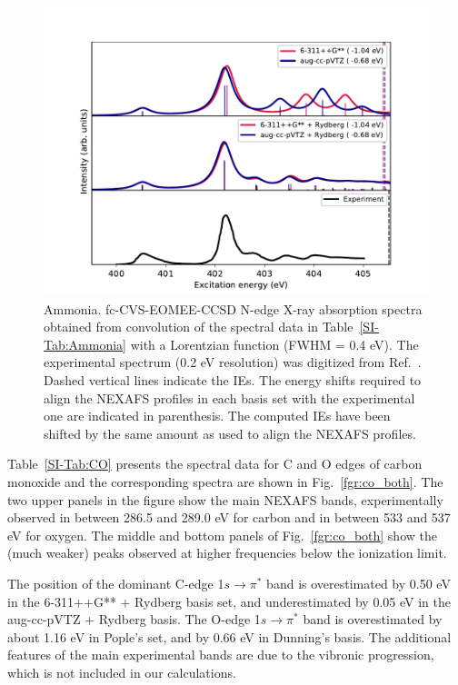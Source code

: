 \documentclass[journal=jctcce,manuscript=article]{achemso}
\begin{document}
\begin{figure}[H]
\includegraphics[width=1\textwidth]{Spectra/NH3.pdf}
\caption{Ammonia. fc-CVS-EOMEE-CCSD N-edge X-ray absorption spectra obtained from convolution of the spectral data in Table~\ref{SI-Tab:Ammonia} 
with a Lorentzian function (FWHM = 0.4 eV). The experimental spectrum (0.2 eV resolution) was digitized from Ref.~. Dashed vertical lines indicate the IEs.
The energy shifts 
required to align the NEXAFS profiles in each basis set with the
experimental one are indicated in parenthesis. The computed IEs have been shifted by the same amount as used to align the NEXAFS profiles.
\label{fgr:ammonia}}
\end{figure}

Table~\ref{SI-Tab:CO} presents the spectral data for C and O edges of carbon monoxide and the corresponding spectra are shown in Fig.~\ref{fgr:co_both}. The two upper panels in the figure show the main NEXAFS bands, experimentally observed 
in between 286.5 and 289.0 eV for carbon and in between 533 and 537 eV for oxygen. The middle and bottom panels of Fig.~\ref{fgr:co_both}
show the (much weaker) peaks observed at higher frequencies below 
the ionization limit.

The position of the dominant C-edge 1$s\to \pi^\ast$ band  is overestimated by 0.50 eV in the 6-311++G** + Rydberg basis set,
and underestimated by 0.05 eV in the aug-cc-pVTZ + Rydberg basis. 
The O-edge 1$s\to \pi^\ast$ band is overestimated by about 1.16 eV in Pople's set, and by 0.66 eV in Dunning's basis. The additional features of the main experimental bands are due to the vibronic progression, which is not included in our calculations. 
\end{document}
